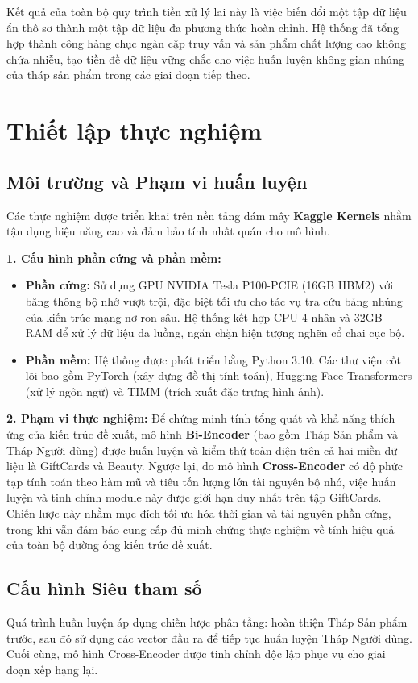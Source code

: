 Kết quả của toàn bộ quy trình tiền xử lý lai này là việc biến đổi một tập dữ liệu ẩn thô sơ thành một tập dữ liệu đa phương thức hoàn chỉnh. Hệ thống đã tổng hợp thành công hàng chục ngàn cặp truy vấn và sản phẩm chất lượng cao không chứa nhiễu, tạo tiền đề dữ liệu vững chắc cho việc huấn luyện không gian nhúng của tháp sản phẩm trong các giai đoạn tiếp theo.

\section{Thiết lập thực nghiệm}

\subsection{Môi trường và Phạm vi huấn luyện}
Các thực nghiệm được triển khai trên nền tảng đám mây \textbf{Kaggle Kernels} nhằm tận dụng hiệu năng cao và đảm bảo tính nhất quán cho mô hình.

\textbf{1. Cấu hình phần cứng và phần mềm:}
\begin{itemize}
    \item \textbf{Phần cứng:} Sử dụng GPU NVIDIA Tesla P100-PCIE (16GB HBM2) với băng thông bộ nhớ vượt trội, đặc biệt tối ưu cho tác vụ tra cứu bảng nhúng của kiến trúc mạng nơ-ron sâu. Hệ thống kết hợp CPU 4 nhân và 32GB RAM để xử lý dữ liệu đa luồng, ngăn chặn hiện tượng nghẽn cổ chai cục bộ.
    \item \textbf{Phần mềm:} Hệ thống được phát triển bằng Python 3.10. Các thư viện cốt lõi bao gồm PyTorch (xây dựng đồ thị tính toán), Hugging Face Transformers (xử lý ngôn ngữ) và TIMM (trích xuất đặc trưng hình ảnh).
\end{itemize}

\textbf{2. Phạm vi thực nghiệm:}
Để chứng minh tính tổng quát và khả năng thích ứng của kiến trúc đề xuất, mô hình \textbf{Bi-Encoder} (bao gồm Tháp Sản phẩm và Tháp Người dùng) được huấn luyện và kiểm thử toàn diện trên cả hai miền dữ liệu là GiftCards và Beauty. Ngược lại, do mô hình \textbf{Cross-Encoder} có độ phức tạp tính toán theo hàm mũ và tiêu tốn lượng lớn tài nguyên bộ nhớ, việc huấn luyện và tinh chỉnh module này được giới hạn duy nhất trên tập GiftCards. Chiến lược này nhằm mục đích tối ưu hóa thời gian và tài nguyên phần cứng, trong khi vẫn đảm bảo cung cấp đủ minh chứng thực nghiệm về tính hiệu quả của toàn bộ đường ống kiến trúc đề xuất.

\subsection{Cấu hình Siêu tham số}
Quá trình huấn luyện áp dụng chiến lược phân tầng: hoàn thiện Tháp Sản phẩm trước, sau đó sử dụng các vector đầu ra để tiếp tục huấn luyện Tháp Người dùng. Cuối cùng, mô hình Cross-Encoder được tinh chỉnh độc lập phục vụ cho giai đoạn xếp hạng lại.

